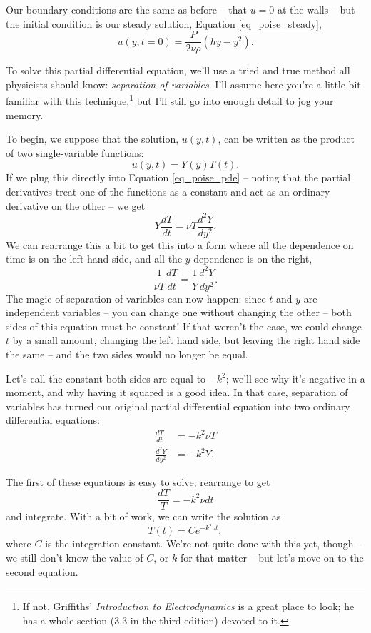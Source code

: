 Our boundary conditions are the same as before -- that $u = 0$ at the walls -- but the initial condition is our steady solution, Equation \ref{eq_poise_steady},
\begin{equation}
\label{eq_poise_ic}
u(y, t=0) = \frac{P}{2\nu \rho} (hy - y^2).
\end{equation}

To solve this partial differential equation, we'll use a tried and true method all physicists should know:  \emph{separation of variables}.  I'll assume here you're a little bit familiar with this technique,\footnote{If not, Griffiths' \emph{Introduction to Electrodynamics} is a great place to look; he has a whole section (3.3 in the third edition) devoted to it.} but I'll still go into enough detail to jog your memory.

To begin, we suppose that the solution, $u(y, t)$, can be written as the product of two single-variable functions:
\begin{equation}
u(y, t) = Y(y) T(t).
\end{equation}
If we plug this directly into Equation \ref{eq_poise_pde} -- noting that the partial derivatives treat one of the functions as a constant and act as an ordinary derivative on the other -- we get
\[
Y \frac{dT}{dt} = \nu T \frac{d^2Y}{dy^2}.
\]
We can rearrange this a bit to get this into a form where all the dependence on time is on the left hand side, and all the $y$-dependence is on the right,
\[
\frac{1}{\nu T} \frac{dT}{dt} = \frac{1}{Y} \frac{d^2Y}{dy^2}.
\]
The magic of separation of variables can now happen:  since $t$ and $y$ are independent variables -- you can change one without changing the other -- both sides of this equation must be constant!  If that weren't the case, we could change $t$ by a small amount, changing the left hand side, but leaving the right hand side the same -- and the two sides would no longer be equal.

Let's call the constant both sides are equal to $-k^2$; we'll see why it's negative in a moment, and why having it squared is a good idea.  In that case, separation of variables has turned our original partial differential equation into two ordinary differential equations:
\begin{align}
\frac{dT}{dt} & = -k^2 \nu T \\
\label{eq_poise_sho} 
\frac{d^2Y}{dy^2} & = -k^2 Y.
\end{align}

The first of these equations is easy to solve; rearrange to get
\[
\frac{dT}{T} = -k^2 \nu dt
\]
and integrate.  With a bit of work, we can write the solution as
\begin{equation}
T(t) = C e^{-k^2 \nu t},
\end{equation}
where $C$ is the integration constant.  We're not quite done with this yet, though -- we still don't know the value of $C$, or $k$ for that matter -- but let's move on to the second equation.  

